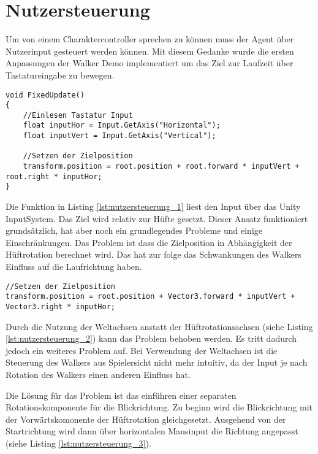 \section{Nutzersteuerung}
Um von einem Charaktercontroller sprechen zu können muss der Agent über Nutzerinput gesteuert werden können. Mit diesem Gedanke wurde die ersten Anpassungen der Walker Demo implementiert um das Ziel zur Laufzeit über Tastatureingabe zu bewegen.
\begin{lstlisting}[caption={Nutzersteuerung erster Prototyp},captionpos=b,label={lst:nutzersteuerung_1}]
void FixedUpdate()
{
    //Einlesen Tastatur Input
    float inputHor = Input.GetAxis("Horizontal");
    float inputVert = Input.GetAxis("Vertical");
        
    //Setzen der Zielposition
    transform.position = root.position + root.forward * inputVert + root.right * inputHor;
}
\end{lstlisting}
Die Funktion in Listing \ref{lst:nutzersteuerung_1} liest den Input über das Unity InputSystem. Das Ziel wird relativ zur Hüfte gesetzt. Dieser Ansatz funktioniert grundsätzlich, hat aber noch ein grundlegendes Probleme und einige Einschränkungen. Das Problem ist dass die Zielposition in Abhängigkeit der Hüftrotation berechnet wird. Das hat zur folge das Schwankungen des Walkers Einfluss auf die Laufrichtung haben.

\begin{lstlisting}[caption={Nutzersteuerung berechnung mit Weltachsen},captionpos=b,label={lst:nutzersteuerung_2}]
//Setzen der Zielposition
transform.position = root.position + Vector3.forward * inputVert + Vector3.right * inputHor;
\end{lstlisting}
Durch die Nutzung der Weltachsen anstatt der Hüftrotationsachsen (siehe Listing \ref{lst:nutzersteuerung_2}) kann das Problem behoben werden. Es tritt dadurch jedoch ein weiteres Problem auf. Bei Verwendung der Weltachsen ist die Steuerung des Walkers aus Spielersicht nicht mehr intuitiv, da der Input je nach Rotation des Walkers einen anderen Einfluss hat.

Die Lösung für das Problem ist das einführen einer separaten Rotationskomponente für die Blickrichtung. Zu beginn wird die Blickrichtung mit der Vorwärtskomonente der Hüftrotation gleichgesetzt. Ausgehend von der Startrichtung wird dann über horizontalen Mausinput die Richtung angepasst (siehe Listing \ref{lst:nutzersteuerung_3}).

